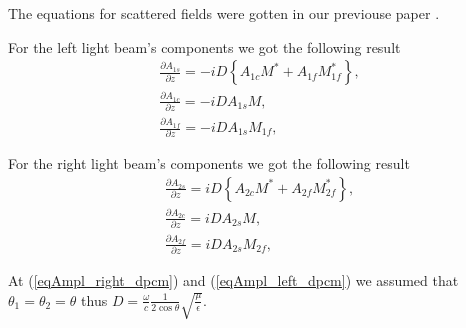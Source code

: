 The equations for scattered fields were gotten in our previouse paper
\cite{OurDPCM}. 

For the left light beam's components we got the following result
\begin{eqnarray}
\frac{\partial{A_{1s}}}{\partial{z}} = 
- i D \left\{ 
A_{1c} M^{\ast} + A_{1f} M_{1f}^{\ast} \right\},
\nonumber \\
\frac{\partial{A_{1c}}}{\partial{z}} = - 
i D A_{1s} M,
\nonumber \\
\frac{\partial{A_{1f}}}{\partial{z}} = 
- i D A_{1s} M_{1f},
\label{eqAmpl_left_dpcm}
\end{eqnarray}

For the right light beam's components we got the following result
\begin{eqnarray}
\frac{\partial{A_{2s}}}{\partial{z}} = 
 i D
 \left\{ 
A_{2c} M^{\ast} + A_{2f} M_{2f}^{\ast} \right\},
\nonumber \\
\frac{\partial{A_{2c}}}{\partial{z}} =  
i D
A_{2s} M,
\nonumber \\
\frac{\partial{A_{2f}}}{\partial{z}} = 
i D
A_{2s} M_{2f},
\label{eqAmpl_right_dpcm}
\end{eqnarray}

At (\ref{eqAmpl_right_dpcm}) and (\ref{eqAmpl_left_dpcm}) we assumed
that $\theta_1 =\theta_2=\theta$ thus
$D=\frac{\omega}c\frac 1 {2 \cos \theta}\sqrt{\frac\mu\epsilon}$.
